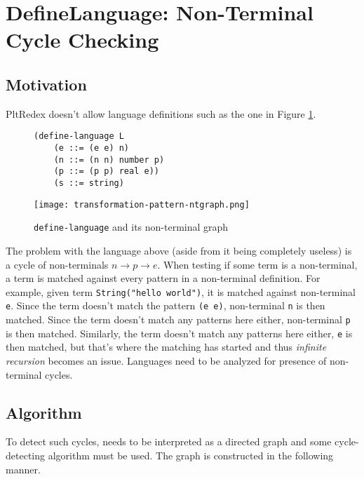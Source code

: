 \section{DefineLanguage: Non-Terminal Cycle Checking}

\subsection{Motivation}
PltRedex doesn't allow language definitions such as the one in Figure \ref{dl-ntcyclegraph}.

\begin{figure}[H]
\begin{minipage}{0.45\linewidth}
	\centering
\begin{verbatim}
(define-language L
	(e ::= (e e) n)
	(n ::= (n n) number p)
	(p ::= (p p) real e))
	(s ::= string)
\end{verbatim}
\end{minipage}
\begin{minipage}{0.45\linewidth}
	\centering
	\texttt{[image: transformation-pattern-ntgraph.png]}
\end{minipage}
	\caption{\texttt{define-language} and its non-terminal graph}
	\label{dl-ntcyclegraph}
\end{figure}

The problem with the language above (aside from it being completely useless) is a cycle of non-terminals $n \rightarrow p \rightarrow e$. When testing if some term is a non-terminal, a term is matched against every pattern in a non-terminal definition. For example, given term \texttt{String("hello world")}, it is matched against non-terminal \texttt{e}. Since  the term doesn't match the pattern \texttt{(e e)}, non-terminal \texttt{n} is then matched. Since the term doesn't match any patterns here either, non-terminal \texttt{p} is then matched. Similarly, the term doesn't match any patterns here either, \texttt{e} is then matched, but that's where the matching has started and thus \textit{infinite recursion} becomes an issue. Languages need to be analyzed for presence of non-terminal cycles.

\subsection{Algorithm}
To detect such cycles, \DefineLanguageNoArg \space needs to be interpreted as a directed graph and some cycle-detecting algorithm must be used. The graph is constructed in the following manner.

